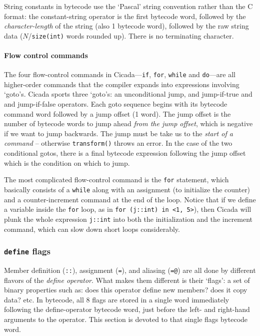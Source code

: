 \documentclass{article}
\begin{document}
String constants in bytecode use the `Pascal' string convention rather than the C format:  the constant-string operator is the first bytecode word, followed by the \emph{character-length} of the string (also 1 bytecode word), followed by the raw string data ($N$/\verb#size(int)# words rounded up).  There is no terminating character.



\paragraph{Flow control commands}

The four flow-control commands in Cicada---\verb#if#, \verb#for#, \verb#while# and \verb#do#---are all higher-order commands that the compiler expands into expressions involving `goto's.  Cicada sports three `goto's:  an unconditional jump, and jump-if-true and and jump-if-false operators.  Each goto sequence begins with its bytecode command word followed by a jump offset (1 word).  The jump offset is the number of bytecode words to jump ahead \emph{from the jump offset}, which is negative if we want to jump backwards.  The jump must be take us to the \emph{start of a command} -- otherwise \verb#transform()# throws an error.  In the case of the two conditional gotos, there is a final bytecode expression following the jump offset which is the condition on which to jump.

The most complicated flow-control command is the \verb#for# statement, which basically consists of a \verb#while# along with an assignment (to initialize the counter) and a counter-increment command at the end of the loop.  Notice that if we define a variable inside the \verb#for# loop, as in \verb#for (j::int) in <1, 5>#), then Cicada will plunk the whole expression \verb#j::int# into both the initialization and the increment command, which can slow down short loops considerably.





\subsubsection{\texttt{define} flags} 

Member definition (\verb#::#), assignment (\verb#=#), and aliasing (\verb#=@#) are all done by different flavors of the \emph{define operator}.  What makes them different is their `flags':  a set of binary properties such as:  does this operator define new members? does it copy data? etc.  In bytecode, all 8 flags are stored in a single word immediately following the define-operator bytecode word, just before the left- and right-hand arguments to the operator.  This section is devoted to that single flags bytecode word.
\end{document}

